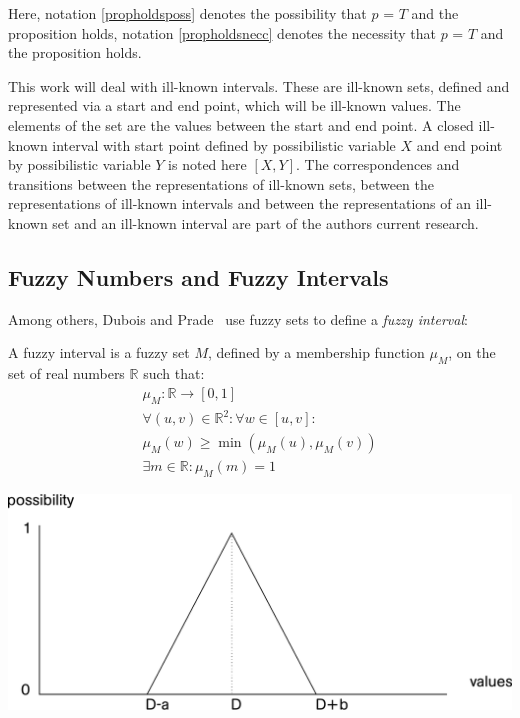 Here, notation \ref{propholdsposs} denotes the possibility that $p$ = $T$ and the proposition holds, notation \ref{propholdsnecc} denotes the necessity that $p$ = $T$ and the proposition holds.

This work will deal with ill-known intervals. These are ill-known sets, defined and represented via a start and end point, which will be ill-known values. The elements of the set are the values between the start and end point. A closed ill-known interval with start point defined by possibilistic variable $X$ and end point by possibilistic variable $Y$ is noted here $\left[X, Y\right]$. The correspondences and transitions between the representations of ill-known sets, between the representations of ill-known intervals and between the representations of an ill-known set and an ill-known interval are part of the authors current research.

\subsection{\label{subsec:fuzzy-numbers}Fuzzy Numbers and Fuzzy Intervals}
Among others, Dubois and Prade~\cite{Dubois1983} use fuzzy sets \cite{Zadeh1965} to define a \emph{fuzzy interval}:
\begin{definition}
A fuzzy interval is a fuzzy set $M$, defined by a membership function $\mu_{M}$, on the set of real numbers $\mathbb{R}$ such that:
\begin{eqnarray}
\mu_{M} :  \mathbb{R} \rightarrow \left[0,1\right] \nonumber \\ 
\forall (u,v)\in\mathbb{R}^2: \forall w \in [u,v]:\\
\mu_M(w) \geq\min(\mu_M(u),\mu_M(v))  \\
\exists m \in \mathbb{R} :  \mu_M(m)=1 
\end{eqnarray}
\end{definition}

\vspace*{13pt}
\begin{center}
{
\includegraphics[scale=0.25]{./graphs/triangular.pdf}

}
\end{center}
\vspace*{10pt}
\vspace*{13pt}


